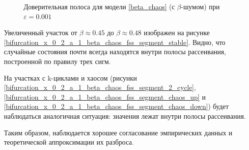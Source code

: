 \begin{figure}
            
        \captionsetup{justification=centering}
        \caption{Доверительная полоса для модели \ref{beta_chaos} (с \(\beta\)-шумом) при \(\varepsilon = 0.001\)}
    \end{figure}

    Увеличенный участок от \(\beta \approx 0.45\) до \(\beta \approx 0.48\) изображен на рисунке \ref{bifurcation_x_0_2_a_1_beta_chaos_fss_segment_stable}. Видно, что случайные состояния почти всегда находятся внутри полосы рассеивания, построенной по правилу трех сигм. 

    На участках с k-циклами и хаосом (рисунки \ref{bifurcation_x_0_2_a_1_beta_chaos_fss_segment_2_cycle}, \ref{bifurcation_x_0_2_a_1_beta_chaos_fss_segment_chaos_up} и \ref{bifurcation_x_0_2_a_1_beta_chaos_fss_segment_chaos_down}) будет наблюдаться аналогичная ситуация: значения лежат внутри полосы рассеивания.

    Таким образом, наблюдается хорошее согласование эмпирических данных и теоретической аппроксимации их разброса.